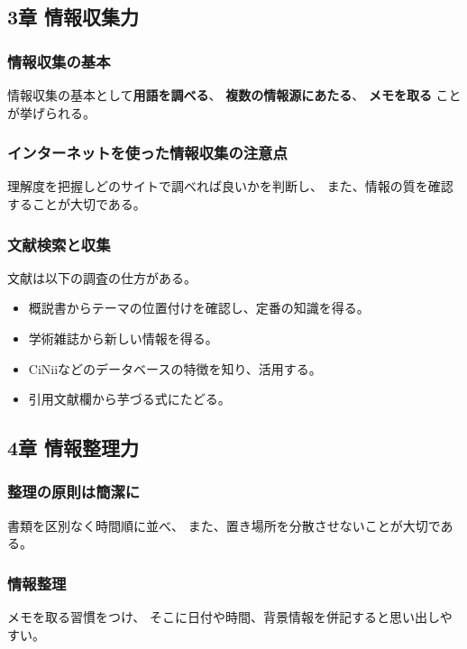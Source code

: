 \documentclass[]{jsarticle}
\begin{document}
    \subsection{3章 情報収集力}
        \subsubsection*{情報収集の基本}
            情報収集の基本として{\bf 用語を調べる}、
            {\bf 複数の情報源にあたる}、
            {\bf メモを取る}
            ことが挙げられる。

        \subsubsection*{インターネットを使った情報収集の注意点}
            理解度を把握しどのサイトで調べれば良いかを判断し、
            また、情報の質を確認することが大切である。

        \subsubsection*{文献検索と収集}
            文献は以下の調査の仕方がある。

            \begin{itemize}
                \item 概説書からテーマの位置付けを確認し、定番の知識を得る。
                \item 学術雑誌から新しい情報を得る。
                \item CiNiiなどのデータベースの特徴を知り、活用する。
                \item 引用文献欄から芋づる式にたどる。
            \end{itemize}

    \subsection{4章 情報整理力}
        \subsubsection*{整理の原則は簡潔に}
            書類を区別なく時間順に並べ、
            また、置き場所を分散させないことが大切である。

        \subsubsection*{情報整理}
            メモを取る習慣をつけ、
            そこに日付や時間、背景情報を併記すると思い出しやすい。
\end{document}
